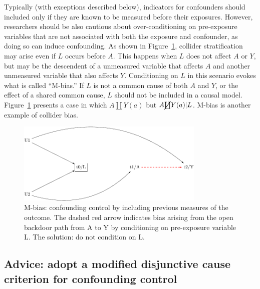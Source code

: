 \documentclass[
  singlecolumn]{report}
\begin{document}
Typically (with exceptions described below), indicators for confounders
should included only if they are known to be measured before their
exposures. However, researchers should be also cautious about
over-conditioning on pre-exposure variables that are not associated with
both the exposure and confounder, as doing so can induce confounding. As
shown in Figure~\ref{fig-m-bias}, collider stratification may arise even
if \(L\) occurs before \(A\). This happens when \(L\) does not affect
\(A\) or \(Y\), but may be the descendent of a unmeasured variable that
affects \(A\) and another unmeasured variable that also affects \(Y\).
Conditioning on \(L\) in this scenario evokes what is called ``M-bias.''
If \(L\) is not a common cause of both \(A\) and \(Y\), or the effect of
a shared common cause, \(L\) should not be included in a causal model.
Figure~\ref{fig-m-bias} presents a case in which \(A \coprod Y(a)\) but
\(A \cancel{\coprod} Y(a)| L\). M-bias is another example of collider
bias.

\begin{figure}

{\centering \includegraphics[width=0.8\textwidth,height=\textheight]{causal-dags_files/figure-pdf/fig-m-bias-1.pdf}

}

\caption{\label{fig-m-bias}M-bias: confounding control by including
previous measures of the outcome. The dashed red arrow indicates bias
arising from the open backdoor path from A to Y by conditioning on
pre-exposure variable L. The solution: do not condition on L.}

\end{figure}

\hypertarget{advice-adopt-a-modified-disjunctive-cause-criterion-for-confounding-control}{%
\subsection{Advice: adopt a modified disjunctive cause criterion for
confounding
control}\label{advice-adopt-a-modified-disjunctive-cause-criterion-for-confounding-control}}
\end{document}

